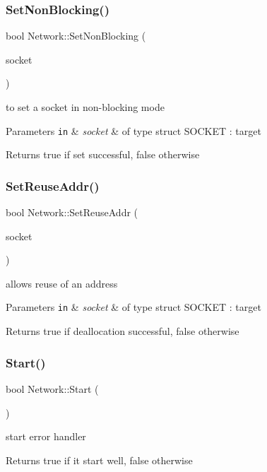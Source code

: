 \subsubsection{\texorpdfstring{Set\+Non\+Blocking()}{SetNonBlocking()}}
{\footnotesize\ttfamily bool Network\+::\+Set\+Non\+Blocking (\begin{DoxyParamCaption}\item[{S\+O\+C\+K\+ET}]{socket }\end{DoxyParamCaption})}



to set a socket in non-\/blocking mode 


\begin{DoxyParams}[1]{Parameters}
\mbox{\tt in}  & {\em socket} & of type struct S\+O\+C\+K\+ET \+: target\\
\hline
\end{DoxyParams}
\begin{DoxyReturn}{Returns}
true if set successful, false otherwise 
\end{DoxyReturn}
\mbox{\label{namespace_network_af60ca5be87dc2bb828053b77586c5db1}} 
\subsubsection{\texorpdfstring{Set\+Reuse\+Addr()}{SetReuseAddr()}}
{\footnotesize\ttfamily bool Network\+::\+Set\+Reuse\+Addr (\begin{DoxyParamCaption}\item[{S\+O\+C\+K\+ET}]{socket }\end{DoxyParamCaption})}



allows reuse of an address 


\begin{DoxyParams}[1]{Parameters}
\mbox{\tt in}  & {\em socket} & of type struct S\+O\+C\+K\+ET \+: target\\
\hline
\end{DoxyParams}
\begin{DoxyReturn}{Returns}
true if deallocation successful, false otherwise 
\end{DoxyReturn}
\mbox{\label{namespace_network_af8698db2b5ae3d0da4544304cffc3abb}} 
\subsubsection{\texorpdfstring{Start()}{Start()}}
{\footnotesize\ttfamily bool Network\+::\+Start (\begin{DoxyParamCaption}{ }\end{DoxyParamCaption})}



start error handler 

\begin{DoxyReturn}{Returns}
true if it start well, false otherwise 
\end{DoxyReturn}

